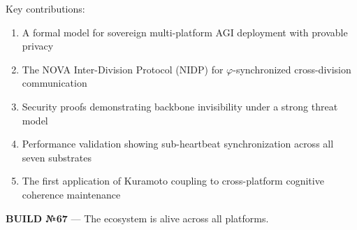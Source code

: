 \documentclass[12pt]{article}
\newcommand{\PHI}{\varphi}
\begin{document}
Key contributions:
\begin{enumerate}
    \item A formal model for sovereign multi-platform AGI deployment with provable privacy
    \item The NOVA Inter-Division Protocol (NIDP) for $\PHI$-synchronized cross-division communication
    \item Security proofs demonstrating backbone invisibility under a strong threat model
    \item Performance validation showing sub-heartbeat synchronization across all seven substrates
    \item The first application of Kuramoto coupling to cross-platform cognitive coherence maintenance
\end{enumerate}

\bigskip
\noindent\textbf{BUILD №67} — The ecosystem is alive across all platforms.

\end{document}
